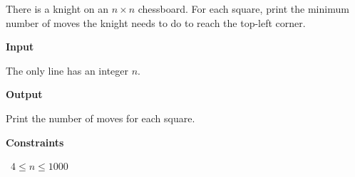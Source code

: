 There is a knight on an $n \times n$ chessboard. For each square, print the minimum number of moves the knight needs to do to reach the top-left corner.

\vspace{0.3cm}\noindent\textbf{Input}

The only line has an integer $n$.

\vspace{0.3cm}\noindent\textbf{Output}

Print the number of moves for each square.

\vspace{0.3cm}\noindent\textbf{Constraints}

\textbullet\ $4 \le n \le 1000$